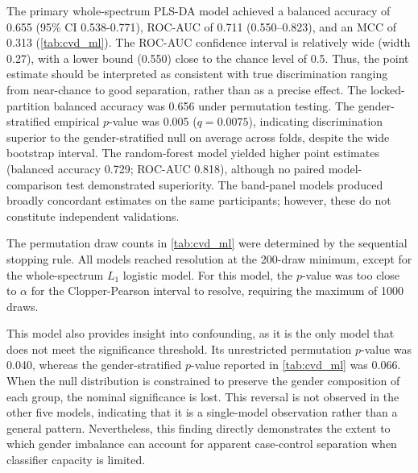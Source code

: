 \documentclass[preprint,12pt]{elsarticle}
\begin{document}
The primary whole-spectrum PLS-DA model achieved a balanced accuracy of 0.655 (95\% CI 0.538-0.771), ROC-AUC of 0.711 (0.550–0.823), and an MCC of 0.313 (\cref{tab:cvd_ml}). The ROC-AUC confidence interval is relatively wide (width 0.27), with a lower bound (0.550) close to the chance level of 0.5. Thus, the point estimate should be interpreted as consistent with true discrimination ranging from near-chance to good separation, rather than as a precise effect. The locked-partition balanced accuracy was 0.656 under permutation testing. The gender-stratified empirical $p$-value was 0.005 ($q=0.0075$), indicating discrimination superior to the gender-stratified null on average across folds, despite the wide bootstrap interval. The random-forest model yielded higher point estimates (balanced accuracy 0.729; ROC-AUC 0.818), although no paired model-comparison test demonstrated superiority. The band-panel models produced broadly concordant estimates on the same participants; however, these do not constitute independent validations.

The permutation draw counts in \cref{tab:cvd_ml} were determined by the sequential stopping rule. All models reached resolution at the 200-draw minimum, except for the whole-spectrum $L_1$ logistic model. For this model, the $p$-value was too close to $\alpha$ for the Clopper-Pearson interval to resolve, requiring the maximum of 1000 draws.

This model also provides insight into confounding, as it is the only model that does not meet the significance threshold. Its unrestricted permutation $p$-value was 0.040, whereas the gender-stratified $p$-value reported in \cref{tab:cvd_ml} was 0.066. When the null distribution is constrained to preserve the gender composition of each group, the nominal significance is lost. This reversal is not observed in the other five models, indicating that it is a single-model observation rather than a general pattern. Nevertheless, this finding directly demonstrates the extent to which gender imbalance can account for apparent case-control separation when classifier capacity is limited.
\end{document}
